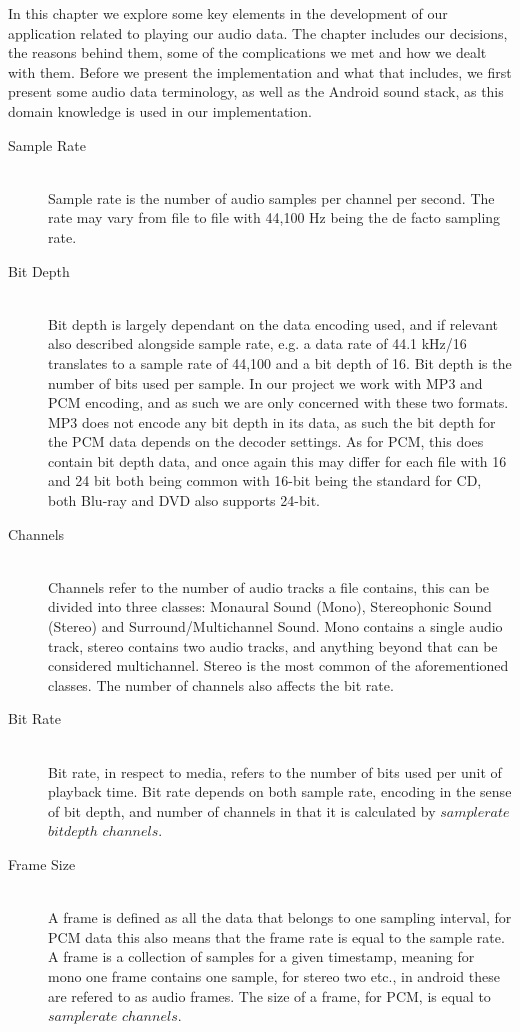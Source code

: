 In this chapter we explore some key elements in the development of our application related to playing our audio data.
The chapter includes our decisions, the reasons behind them, some of the complications we met and how we dealt with them.
Before we present the implementation and what that includes, we first present some audio data terminology, as well as the Android sound stack, as this domain knowledge is used in our implementation.
\begin{description}
    \item [Sample Rate] \cite{sample_rate_std} \hfill \\
    Sample rate is the number of audio samples per channel per second.
    The rate may vary from file to file with 44,100 Hz being the de facto sampling rate.
    \item [Bit Depth] \cite{bit_depth} \hfill \\
    Bit depth is largely dependant on the data encoding used, and if relevant also described alongside sample rate, e.g. a data rate of 44.1 kHz/16 translates to a sample rate of 44,100 and a bit depth of 16.
    Bit depth is the number of bits used per sample.
    In our project we work with MP3 and PCM encoding, and as such we are only concerned with these two formats.
    MP3 does not encode any bit depth in its data, as such the bit depth for the \ac{PCM} data depends on the decoder settings.
    As for PCM, this does contain bit depth data, and once again this may differ for each file with 16 and 24 bit both being common with 16-bit being the standard for CD, both Blu-ray and DVD also supports 24-bit.
    \item [Channels] \cite{channels} \hfill \\
    Channels refer to the number of audio tracks a file contains, this can be divided into three classes: Monaural Sound (Mono), Stereophonic Sound (Stereo) and Surround/Multichannel Sound.
    Mono contains a single audio track, stereo contains two audio tracks, and anything beyond that can be considered multichannel.
    Stereo is the most common of the aforementioned classes.
    The number of channels also affects the bit rate.
    \item [Bit Rate] \cite{bit_rate} \hfill \\ 
    Bit rate, in respect to media, refers to the number of bits used per unit of playback time.
    Bit rate depends on both sample rate, encoding in the sense of bit depth, and number of channels in that it is calculated by $sample rate$ \times $bit depth$ \times $channels$.
    \item [Frame Size] \cite{audioformat} \hfill \\
    A frame is defined as all the data that belongs to one sampling interval, for PCM data this also means that the frame rate is equal to the sample rate.
    A frame is a collection of samples for a given timestamp, meaning for mono one frame contains one sample, for stereo two etc., in android these are refered to as audio frames.
    The size of a frame, for PCM, is equal to $sample rate$ \times $channels$.
\end{description}
